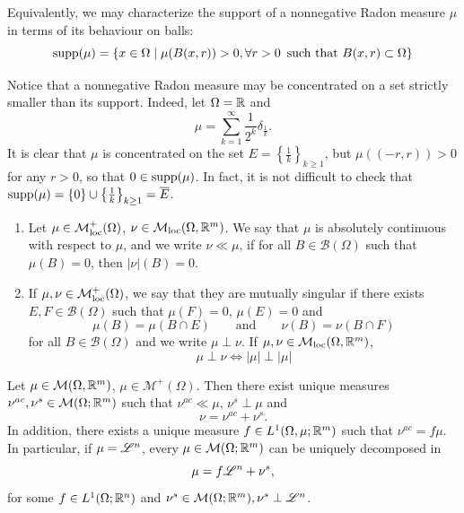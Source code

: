 \begin{exercise}
Equivalently, we may characterize the support of a nonnegative Radon measure $\mu$ in terms of its behaviour on balls:
\[
\operatorname{supp} (\mu) = \{x \in \Omega \mid \mu(B(x,r)) > 0, \forall r > 0 \, \text{ such that } B(x,r) \subset \Omega\}
\]
\end{exercise}

\begin{remark}
Notice that a nonnegative Radon measure may be concentrated on a set strictly smaller than its support. Indeed, let $\Omega = \mathbb{R}$ and $$\mu = \sum_{k = 1}^{\infty} \frac{1}{2^{k}} \delta_{\frac{1}{k}}.$$
It is clear that $\mu$ is concentrated on the set $E = \left \{ \frac{1}{k}\right \}_{k \ge 1}$, but $\mu((-r, r)) > 0$ for any $r> 0$, so that $0 \in \operatorname{supp}(\mu)$. In fact, it is not difficult to check that $\operatorname{supp}(\mu) = \{0\} \cup \left \{ \frac{1}{k}\right \}_{k \ge 1} = \overline{E}$. 
\end{remark}

\begin{definition}\hfill
\begin{enumerate}[1.]
\item Let $\mu \in \mathcal{M}^{+}_{\rm loc}(\Omega)$, $\nu \in \mathcal{M}_{\rm loc}(\Omega,\mathbb{R}^m)$. We say
that $\mu$ is absolutely continuous with respect to $\mu$, and we write $\nu \ll \mu$, if
for all $B \in \mathcal{B}(\Omega)$ such that $\mu(B) = 0$, then $|\nu|(B) = 0$.
\item If $\mu,\nu \in \mathcal{M}^+_{\rm loc}(\Omega)$, we say that they are mutually
singular if there exists $E,F \in \mathcal{B}(\Omega)$ such that $\mu(F) =0$,
$\mu(E) = 0$ and 
\[
\mu(B) = \mu (B\cap E) \qquad \text{and} \qquad
\nu(B) = \nu(B \cap F)
\]
for all $B \in \mathcal{B}(\Omega)$ and we write $\mu \perp \nu$. If $\mu,\nu
\in \mathcal{M}_{\rm loc}(\Omega,\mathbb{R}^m)$, 
\[
\mu \perp \nu \iff |\mu| \perp |\mu|
\]
\end{enumerate}
\end{definition}

\begin{theorem} \label{thm:Radon_Nikodym}
Let $\mu \in \mathcal{M}(\Omega,\mathbb{R}^m)$, $\mu \in \mathcal{M}^+(\Omega)$. Then
there exist unique measures $\nu^{ac},\nu^{s} \in \mathcal{M}(\Omega; \mathbb{R}^m)$ such
that $\nu^{ac} \ll \mu$, $\nu^s \perp \mu$ and 
\begin{equation} \label{eq:Leb_decomp}
\nu = \nu^{ac} + \nu^s. 
\end{equation}
In addition, there exists a unique measure $f\in L^1(\Omega,\mu;\mathbb{R}^m)$ such that
$\nu^{ac} = f\mu$.
\\
In particular, if $\mu = \mathscr{L}^{n}$, every $\mu \in \mathcal{M}(\Omega;\mathbb{R}^m)$ can be
uniquely decomposed in
\[
\mu = f \mathscr{L}^{n} + \nu^s, 
\]
for some $f\in L^1(\Omega; \mathbb{R}^n)$ and $\nu^s \in \mathcal{M}(\Omega;\mathbb{R}^m), \nu^s \perp \mathscr{L}^{n}$.
\end{theorem}

